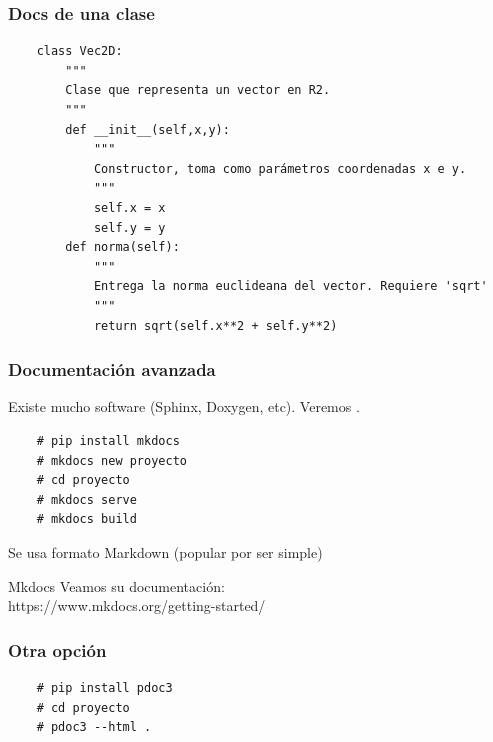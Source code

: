 \documentclass[14pt,aspectratio=169,xcolor=dvipsnames]{beamer}
\begin{document}
\begin{frame}[fragile]\frametitle{Docs de una clase}
    \begin{footnotesize}
    \begin{verbatim}
    class Vec2D:
        """
        Clase que representa un vector en R2.
        """
        def __init__(self,x,y):
            """
            Constructor, toma como parámetros coordenadas x e y.
            """
            self.x = x
            self.y = y
        def norma(self):
            """
            Entrega la norma euclideana del vector. Requiere 'sqrt'
            """
            return sqrt(self.x**2 + self.y**2)
    \end{verbatim}

    \vspace{-1cm}
    \hfill    {}
    \end{footnotesize}
\end{frame}
\begin{frame}[fragile]\frametitle{Documentación avanzada}
    Existe mucho software (Sphinx, Doxygen, etc). Veremos .

    \begin{verbatim}
    # pip install mkdocs
    # mkdocs new proyecto
    # cd proyecto
    # mkdocs serve
    # mkdocs build
    \end{verbatim} 

    \vspace{1cm}
    Se usa formato Markdown (popular por ser simple)

\end{frame}
\begin{frame}{Mkdocs}
    Veamos su documentación: \\https://www.mkdocs.org/getting-started/
\end{frame}
\begin{frame}[fragile]\frametitle{Otra opción}
    \begin{verbatim}
    # pip install pdoc3
    # cd proyecto
    # pdoc3 --html .
    \end{verbatim}

\end{frame}
\end{document}
